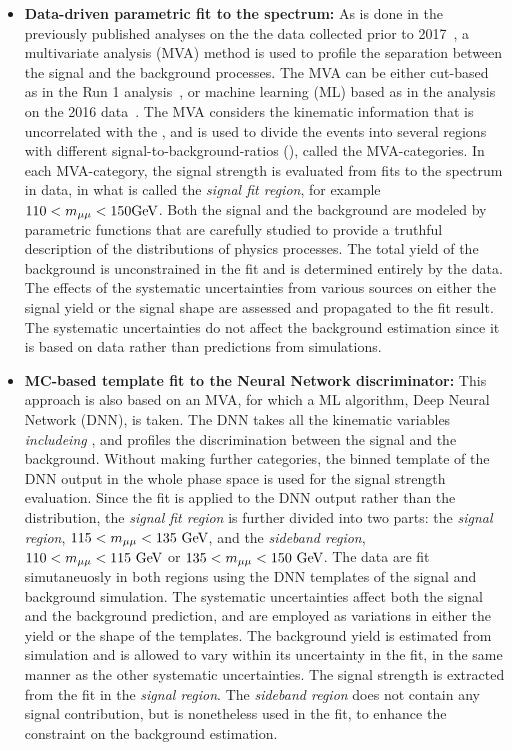 \begin{itemize}
    \item \textbf{Data-driven parametric fit to the \mmm spectrum:} 
          As is done in the previously published analyses on the the data collected prior to 2017~\cite{2015184, PhysRevLett.122.021801},  
          a multivariate analysis (MVA) method is used to profile the separation between the signal and the background processes. 
          The MVA can be either cut-based as in the Run 1 analysis~\cite{2015184}, or machine learning (ML) based as in the analysis on the 2016 data~\cite{PhysRevLett.122.021801}.
          The MVA considers the kinematic information that is uncorrelated with the \mmm, and is used to divide the events into several regions 
          with different signal-to-background-ratios (\SoB), called the MVA-categories. 
          In each MVA-category, the signal strength is evaluated from fits to the \mmm spectrum in data, in what is called the \textit{signal fit region}, for example $110<m_{\mu\mu}<150 \mbox{GeV}$.
          Both the signal and the background are modeled by parametric functions that are carefully studied to provide a truthful description of the distributions of physics processes. 
          The total yield of the background is unconstrained in the fit and is determined entirely by the data.
          The effects of the systematic uncertainties from various sources on either the signal yield or the signal shape are assessed and propagated to the fit result. 
          The systematic uncertainties do not affect the background estimation since it is based on data rather than predictions from simulations.
    \item \textbf{MC-based template fit to the Neural Network discriminator:}
          This approach is also based on an MVA, for which a ML algorithm, Deep Neural Network (DNN), is taken.
          The DNN takes all the kinematic variables \textit{includeing \mmm}, and profiles the discrimination between the signal and the background.
          Without making further categories, the binned template of the DNN output in the whole phase space is used for the signal strength evaluation.
          Since the fit is applied to the DNN output rather than the \mmm distribution, the \textit{signal fit region} is further divided into two parts:
          the \textit{signal region}, $115<m_{\mu\mu}<135 ~\mbox{GeV}$, and the \textit{sideband region}, $110<m_{\mu\mu}<115 ~\mbox{GeV}$ or $135<m_{\mu\mu}<150 ~\mbox{GeV}$.
          The data are fit simutaneuosly in both regions using the DNN templates of the signal and background simulation. 
          The systematic uncertainties affect both the signal and the background prediction, and are employed as variations in either the yield or the shape of the templates.
          The background yield is estimated from simulation and is allowed to vary within its uncertainty in the fit, in the same manner as the other systematic uncertainties.
          The signal strength is extracted from the fit in the \textit{signal region}.
          The \textit{sideband region} does not contain any signal contribution, but is nonetheless used in the fit, to enhance the constraint on the background estimation.
\end{itemize}

